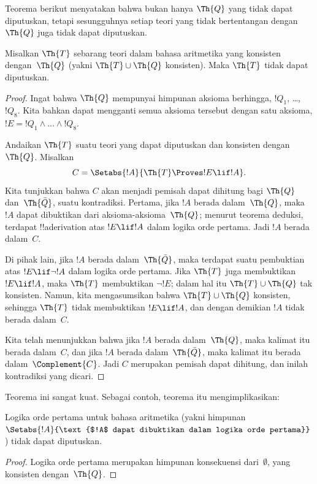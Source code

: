 \documentclass[../../../include/open-logic-section]{subfiles}
\begin{document}


Teorema berikut menyatakan bahwa bukan hanya $\Th{Q}$ yang tidak dapat
diputuskan, tetapi sesungguhnya setiap teori yang tidak bertentangan
dengan~$\Th{Q}$ juga tidak dapat diputuskan.

\begin{thm}
Misalkan $\Th{T}$ sebarang teori dalam bahasa aritmetika yang konsisten
dengan~$\Th{Q}$ (yakni $\Th{T} \cup \Th{Q}$ konsisten). Maka $\Th{T}$ tidak
dapat diputuskan.
\end{thm}

\begin{proof}
Ingat bahwa $\Th{Q}$ mempunyai himpunan aksioma berhingga, $!Q_1$, \dots,
$!Q_8$. Kita bahkan dapat mengganti semua aksioma tersebut dengan satu
aksioma, $!E = !Q_1 \land \dots \land !Q_8$.

Andaikan $\Th{T}$ suatu teori yang dapat diputuskan dan konsisten
dengan~$\Th{Q}$. Misalkan
\[
C = \Setabs{!A}{\Th{T} \Proves !E \lif !A}.
\]
Kita tunjukkan bahwa $C$ akan menjadi pemisah dapat dihitung bagi $\Th{Q}$
dan~$\Th{\bar Q}$, suatu kontradiksi. Pertama, jika $!A$ berada
dalam~$\Th{Q}$, maka $!A$ dapat dibuktikan dari aksioma-aksioma~$\Th{Q}$;
menurut teorema deduksi, terdapat !!a{derivation} atas $!E \lif !A$ dalam
logika orde pertama. Jadi $!A$ berada dalam~$C$.

Di pihak lain, jika $!A$ berada dalam~$\Th{\bar Q}$, maka terdapat suatu
pembuktian atas $!E \lif \lnot !A$ dalam logika orde pertama. Jika
$\Th{T}$ juga membuktikan $!E \lif !A$, maka $\Th{T}$ membuktikan
$\lnot !E$; dalam hal itu $\Th{T} \cup \Th{Q}$ tak konsisten. Namun, kita
mengasumsikan bahwa $\Th{T} \cup \Th{Q}$ konsisten, sehingga $\Th{T}$
tidak membuktikan $!E \lif !A$, dan dengan demikian $!A$ tidak berada
dalam~$C$.

Kita telah menunjukkan bahwa jika $!A$ berada dalam~$\Th{Q}$, maka kalimat
itu berada dalam~$C$, dan jika $!A$ berada dalam~$\Th{\bar Q}$, maka kalimat
itu berada dalam~$\Complement{C}$. Jadi $C$ merupakan pemisah dapat dihitung,
dan inilah kontradiksi yang dicari.
\end{proof}

Teorema ini sangat kuat. Sebagai contoh, teorema itu mengimplikasikan:

\begin{cor}
  Logika orde pertama untuk bahasa aritmetika (yakni himpunan
  $\Setabs{!A}{\text{$!A$ dapat dibuktikan dalam logika orde pertama}}$)
  tidak dapat diputuskan.
\end{cor}

\begin{proof}
Logika orde pertama merupakan himpunan konsekuensi dari~$\emptyset$,
yang konsisten dengan~$\Th{Q}$.
\end{proof}
\end{document}
